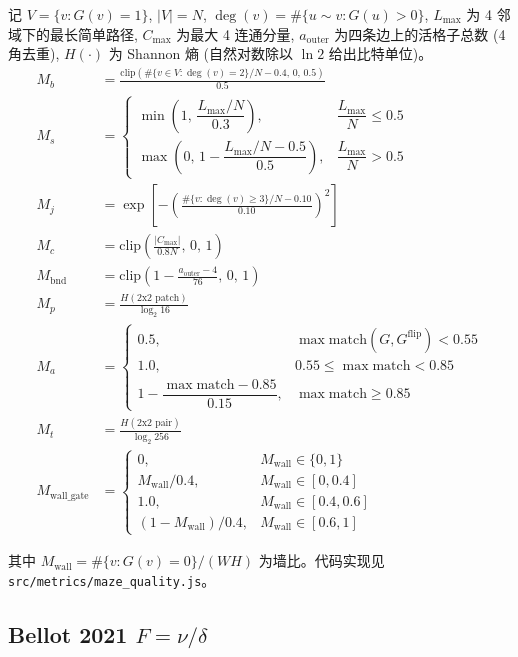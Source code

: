 记 $V = \{v : G(v) = 1\}$, $|V| = N$, $\deg(v) = \#\{u \sim v : G(u) > 0\}$, $L_{\max}$ 为 4 邻域下的最长简单路径, $C_{\max}$ 为最大 4 连通分量, $a_{\text{outer}}$ 为四条边上的活格子总数 (4 角去重), $H(\cdot)$ 为 Shannon 熵 (自然对数除以 $\ln 2$ 给出比特单位)。
\begin{align*}
  M_b &= \frac{\mathrm{clip}\!\left(\#\{v \in V : \deg(v) = 2\} / N - 0.4,\, 0,\, 0.5\right)}{0.5} \\
  M_s &= \begin{cases}
    \min\!\left(1,\, \dfrac{L_{\max}/N}{0.3}\right), & \dfrac{L_{\max}}{N} \le 0.5 \\
    \max\!\left(0,\, 1 - \dfrac{L_{\max}/N - 0.5}{0.5}\right), & \dfrac{L_{\max}}{N} > 0.5
  \end{cases} \\
  M_j &= \exp\!\left[-\left(\frac{\#\{v : \deg(v) \ge 3\} / N - 0.10}{0.10}\right)^{2}\right] \\
  M_c &= \mathrm{clip}\!\left(\frac{|C_{\max}|}{0.8 N},\, 0,\, 1\right) \\
  M_{\text{bnd}} &= \mathrm{clip}\!\left(1 - \frac{a_{\text{outer}} - 4}{76},\, 0,\, 1\right) \\
  M_p &= \frac{H(\text{2x2 patch})}{\log_2 16} \\
  M_a &= \begin{cases}
    0.5, & \max \mathrm{match}(G, G^{\text{flip}}) < 0.55 \\
    1.0, & 0.55 \le \max \mathrm{match} < 0.85 \\
    1 - \dfrac{\max \mathrm{match} - 0.85}{0.15}, & \max \mathrm{match} \ge 0.85
  \end{cases} \\
  M_t &= \frac{H(\text{2x2 pair})}{\log_2 256} \\
  M_{\text{wall\_gate}} &=
  \begin{cases}
    0, & M_{\text{wall}} \in \{0, 1\} \\
    M_{\text{wall}} / 0.4, & M_{\text{wall}} \in [0, 0.4] \\
    1.0, & M_{\text{wall}} \in [0.4, 0.6] \\
    (1 - M_{\text{wall}}) / 0.4, & M_{\text{wall}} \in [0.6, 1]
  \end{cases}
\end{align*}

其中 $M_{\text{wall}} = \#\{v : G(v) = 0\} / (W H)$ 为墙比。代码实现见 \texttt{src/metrics/maze\_quality.js}。

\subsection{Bellot 2021 $F = \nu/\delta$}

